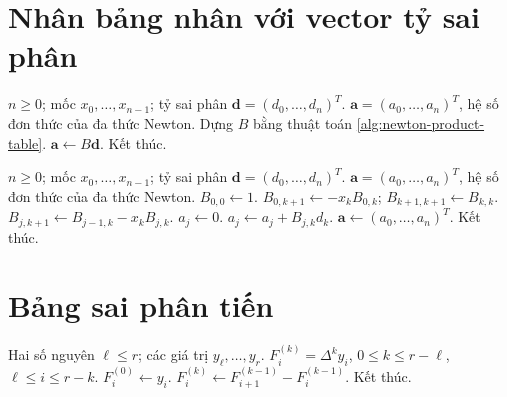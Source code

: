 \documentclass[12pt,a4paper,oneside]{book}
\numberwithin{algorithm}{chapter}
\theoremstyle{definition}
\begin{document}
\section{Nhân bảng nhân với vector tỷ sai phân}
\begin{algorithm}[H]
\caption{Hệ số Newton từ bảng nhân: sơ lược}
\label{alg:newton-table-coefficients-short}
\begin{algorithmic}[1]
\Require $n\geq0$; mốc $x_0,\ldots,x_{n-1}$; tỷ sai phân $\boldsymbol d=(d_0,\ldots,d_n)^T$.
\Ensure $\boldsymbol a=(a_0,\ldots,a_n)^T$, hệ số đơn thức của đa thức Newton.
\State Dựng $B$ bằng thuật toán \ref{alg:newton-product-table}.
\State $\boldsymbol a\gets B\boldsymbol d$.
\State Kết thúc.
\end{algorithmic}
\end{algorithm}
\begin{algorithm}[H]
\caption{Hệ số Newton từ bảng nhân: chi tiết}
\label{alg:newton-table-coefficients}
\begin{algorithmic}[1]
\Require $n\geq0$; mốc $x_0,\ldots,x_{n-1}$; tỷ sai phân $\boldsymbol d=(d_0,\ldots,d_n)^T$.
\Ensure $\boldsymbol a=(a_0,\ldots,a_n)^T$, hệ số đơn thức của đa thức Newton.
\State $B_{0,0}\gets1$.
 \State $B_{0,k+1}\gets-x_kB_{0,k}$; $B_{k+1,k+1}\gets B_{k,k}$.
  \State $B_{j,k+1}\gets B_{j-1,k}-x_kB_{j,k}$.
 \EndFor
\EndFor
\Statex
{}
 \State $a_j\gets0$.
  \State $a_j\gets a_j+B_{j,k}d_k$.
 \EndFor
\EndFor
\Statex
\State $\boldsymbol a\gets(a_0,\ldots,a_n)^T$.
\State Kết thúc.
\end{algorithmic}
\end{algorithm}

\section{Bảng sai phân tiến}
\begin{algorithm}[H]
\caption{Dựng bảng sai phân tiến}
\label{alg:forward-difference-table}
\begin{algorithmic}[1]
\Require Hai số nguyên $\ell\leq r$; các giá trị $y_\ell,\ldots,y_r$.
\Ensure $F_i^{(k)}=\Delta^ky_i$, $0\leq k\leq r-\ell$, $\ell\leq i\leq r-k$.
 \State $F_i^{(0)}\gets y_i$.
\EndFor
\Statex
{}
  \State $F_i^{(k)}\gets F_{i+1}^{(k-1)}-F_i^{(k-1)}$.
 \EndFor
\EndFor
\Statex
\State Kết thúc.
\end{algorithmic}
\end{algorithm}
\end{document}

